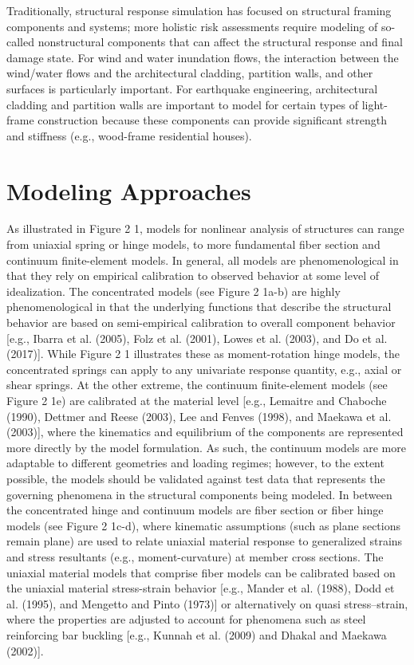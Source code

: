 Traditionally, structural response simulation has focused on structural framing components and systems; more holistic risk assessments require modeling of so-called nonstructural components that can affect the structural response and final damage state. For wind and water inundation flows, the interaction between the wind/water flows and the architectural cladding, partition walls, and other surfaces is particularly important. For earthquake engineering, architectural cladding and partition walls are important to model for certain types of light-frame construction because these components can provide significant strength and stiffness (e.g., wood-frame residential houses).

\section{Modeling Approaches}
\label{sec:resp_struct_methods}

As illustrated in Figure 2 1, models for nonlinear analysis of structures can range from uniaxial spring or hinge models, to more fundamental fiber section and continuum finite-element models. In general, all models are phenomenological in that they rely on empirical calibration to observed behavior at some level of idealization. The concentrated models (see Figure 2 1a-b) are highly phenomenological in that the underlying functions that describe the structural behavior are based on semi-empirical calibration to overall component behavior [e.g., Ibarra et al. (2005), Folz et al. (2001), Lowes et al. (2003), and Do et al. (2017)]. While Figure 2 1 illustrates these as moment-rotation hinge models, the concentrated springs can apply to any univariate response quantity, e.g., axial or shear springs. At the other extreme, the continuum finite-element models (see Figure 2 1e) are calibrated at the material level [e.g., Lemaitre and Chaboche (1990), Dettmer and Reese (2003), Lee and Fenves (1998), and Maekawa et al. (2003)], where the kinematics and equilibrium of the components are represented more directly by the model formulation. As such, the continuum models are more adaptable to different geometries and loading regimes; however, to the extent possible, the models should be validated against test data that represents the governing phenomena in the structural components being modeled. In between the concentrated hinge and continuum models are fiber section or fiber hinge models (see Figure 2 1c-d), where kinematic assumptions (such as plane sections remain plane) are used to relate uniaxial material response to generalized strains and stress resultants (e.g., moment-curvature) at member cross sections. The uniaxial material models that comprise fiber models can be calibrated based on the uniaxial material stress-strain behavior [e.g., Mander et al. (1988), Dodd et al. (1995), and Mengetto and Pinto (1973)] or alternatively on quasi stress–strain, where the properties are adjusted to account for phenomena such as steel reinforcing bar buckling [e.g., Kunnah et al. (2009) and Dhakal and Maekawa (2002)].

